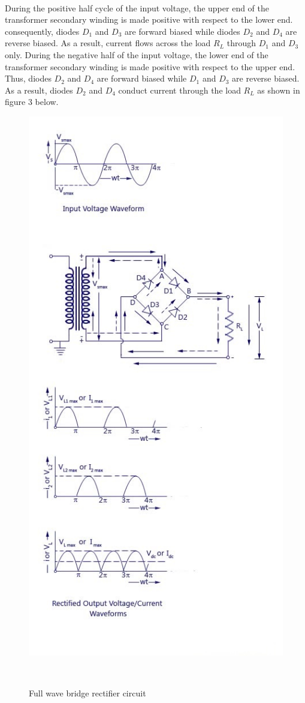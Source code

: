 \documentclass[titlepage]{article}
\begin{document}
\paragraph{}During the positive half cycle of the input voltage, the upper end of the transformer secondary winding is made positive with respect to the lower end. consequently, diodes $D_{1}$ and $D_{3}$ are forward biased while diodes $D_{2}$ and $D_{4}$ are reverse biased. As a result, current flows across the load $R_{L}$ through $D_{1}$ and $D_{3}$ only. During the negative half of the input voltage, the lower end of the transformer secondary winding is made positive with respect to the upper end. Thus, diodes $D_{2}$ and $D_{4}$ are forward biased while $D_{1}$ and $D_{3}$ are reverse  biased. As a result, diodes $D_{2}$ and $D_{4}$ conduct current through the load $R_{L}$ as shown in figure 3 below.
\begin{figure}[h!]
\centering
\includegraphics[scale=0.7]{bridge_rectifier.jpg}
\caption{Full wave bridge rectifier
circuit}~\cite{Circuitstodaywebsite}
\label{bridge_rectifier}
\end{figure}
\clearpage
\end{document}
